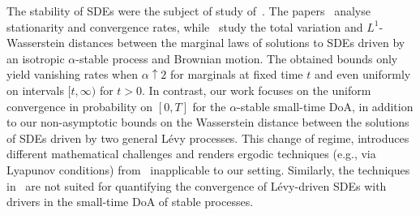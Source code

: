 \documentclass[en,oneside,bbfont,article]{amsart}
\theoremstyle{remark}
\theoremstyle{definition}
\theoremstyle{definition}
\newcommand\1{\mathds{1}}
\newcommand\ua{\uparrow}
\begin{document}
The stability of SDEs were the subject of study of~\cite{deng2024totalvariationdistancesdes,deng2024optimalwasserstein1distancesdes,PTRFAleks,MR4733911,MR4791608}. The papers~\cite{PTRFAleks,MR4733911,MR4791608} analyse stationarity and convergence rates, while~\cite{deng2024totalvariationdistancesdes,deng2024optimalwasserstein1distancesdes} study the total variation and $L^1$-Wasserstein distances between the marginal laws of solutions to SDEs driven by an isotropic $\alpha$-stable process and Brownian motion. The obtained bounds only yield vanishing rates when $\alpha \ua 2$ for marginals at fixed time $t$ and even uniformly on intervals $[t,\infty)$ for $t>0$. In contrast, our work focuses on the uniform convergence in probability on $[0,T]$ for the $\alpha$-stable small-time DoA, in addition to our non-asymptotic bounds on the Wasserstein distance between the solutions of SDEs driven by two general L\'evy processes. This change of regime, introduces different mathematical challenges and renders ergodic techniques (e.g., via Lyapunov conditions) from~\cite{deng2024totalvariationdistancesdes} inapplicable to our setting. %
Similarly, the techniques in~\cite{deng2024optimalwasserstein1distancesdes} are not suited for quantifying the convergence of L\'evy-driven SDEs with drivers in the small-time DoA of stable processes.
\end{document}
